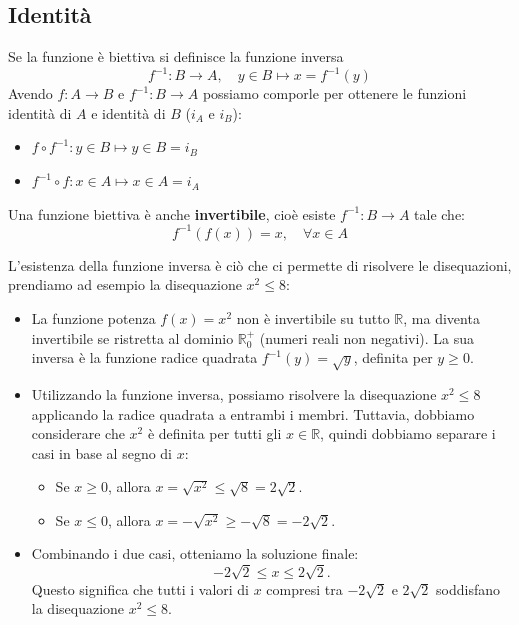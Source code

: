 \documentclass[oneside,10pt]{book} %
\begin{document}
\subsection{Identità}

Se la funzione è biettiva si definisce la funzione inversa
\[
f^{-1}: B \to A, \quad y \in B \mapsto x = f^{-1}(y)
\]
Avendo $f: A \to B$ e $f^{-1}: B \to A$ possiamo comporle per ottenere le funzioni identità di $A$ e identità di $B$ ($i_A$ e $i_B$):
\begin{itemize}
    \item $f \circ f^{-1}: y \in B \mapsto y \in B = i_B$
    \item $f^{-1} \circ f: x \in A \mapsto x \in A = i_A$
\end{itemize}

Una funzione biettiva è anche \textbf{invertibile}, cioè esiste $f^{-1}: B \to A$ tale che:
\[
f^{-1}(f(x)) = x, \quad \forall x \in A
\]

L'esistenza della funzione inversa è ciò che ci permette di risolvere le disequazioni, prendiamo ad esempio la disequazione $x^2 \leq 8$:
\begin{itemize}
    \item La funzione potenza $f(x) = x^2$ non è invertibile su tutto $\mathbb{R}$, ma diventa invertibile se ristretta al dominio $\mathbb{R}^+_0$ (numeri reali non negativi). La sua inversa è la funzione radice quadrata $f^{-1}(y) = \sqrt{y}$, definita per $y \geq 0$.

    \item Utilizzando la funzione inversa, possiamo risolvere la disequazione $x^2 \leq 8$ applicando la radice quadrata a entrambi i membri. Tuttavia, dobbiamo considerare che $x^2$ è definita per tutti gli $x \in \mathbb{R}$, quindi dobbiamo separare i casi in base al segno di $x$:
    \begin{itemize}
        \item Se $x \geq 0$, allora $x = \sqrt{x^2} \leq \sqrt{8} = 2\sqrt{2}$.
        \item Se $x \leq 0$, allora $x = -\sqrt{x^2} \geq -\sqrt{8} = -2\sqrt{2}$.
    \end{itemize}

    \item Combinando i due casi, otteniamo la soluzione finale:
    \[
    -2\sqrt{2} \leq x \leq 2\sqrt{2}.
    \]
    Questo significa che tutti i valori di $x$ compresi tra $-2\sqrt{2}$ e $2\sqrt{2}$ soddisfano la disequazione $x^2 \leq 8$.
  \end{itemize}
\end{document}
